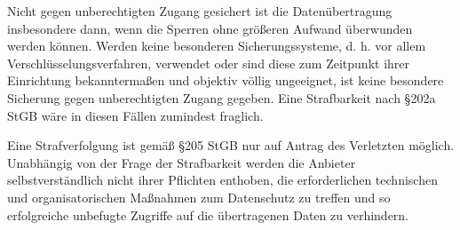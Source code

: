 \documentclass[10pt,a4paper]{article}
\begin{document}
Nicht gegen unberechtigten Zugang gesichert ist die Datenübertragung insbesondere dann, wenn die Sperren ohne größeren Aufwand überwunden werden können. Werden keine besonderen Sicherungssysteme, d. h. vor allem Verschlüsselungsverfahren, verwendet oder sind diese zum Zeitpunkt ihrer Einrichtung bekanntermaßen und objektiv völlig ungeeignet, ist keine besondere Sicherung gegen unberechtigten Zugang gegeben. Eine Strafbarkeit nach §202a StGB wäre in diesen Fällen zumindest fraglich.

Eine Strafverfolgung ist gemäß §205 StGB nur auf Antrag des Verletzten möglich. Unabhängig von der Frage der Strafbarkeit werden die Anbieter selbstverständlich nicht ihrer Pflichten enthoben, die erforderlichen technischen und organisatorischen Maßnahmen zum Datenschutz zu treffen und so erfolgreiche unbefugte Zugriffe auf die übertragenen Daten zu verhindern.~\cite{Datenschutz}



\end{document}
